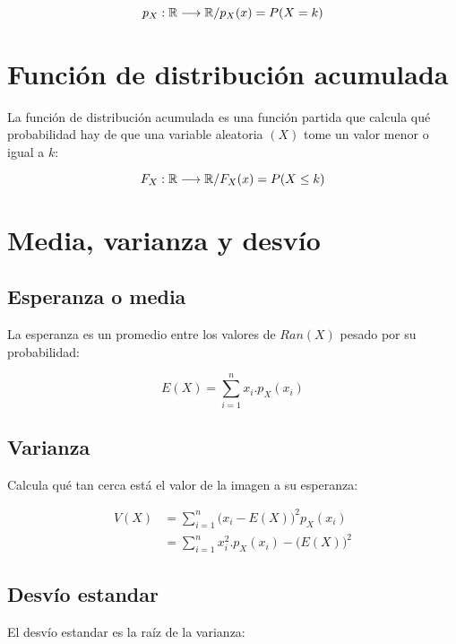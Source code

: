 \documentclass[a5paper,12pt,twoside]{book}
\begin{document}
\begin{equation}
p_X: \mathbb{R} \longrightarrow \mathbb{R} / p_X(x) = P(X=k)
\end{equation}

\section{Función de distribución acumulada}

La función de distribución acumulada es una función partida que calcula qué probabilidad hay de que una variable aleatoria $(X)$ tome un valor menor o igual a $k$:

\begin{equation}
F_X: \mathbb{R} \longrightarrow \mathbb{R} / F_X(x) = P(X \leq k)
\end{equation}

\section{Media, varianza y desvío}

\subsection{Esperanza o media}

La esperanza es un promedio entre los valores de $Ran(X)$ pesado por su probabilidad:

\begin{equation}
E(X)=\sum_{i=1}^n x_i . p_X(x_i)
\end{equation}

\subsection{Varianza}
Calcula qué tan cerca está el valor de la imagen a su esperanza:

\begin{equation}
\begin{split}
V(X) &= \sum_{i=1}^n \big( x_i-E(X) \big)^2 p_X(x_i)
\\
&= \sum_{i=1}^n x_i^2 . p_X(x_i) - \big(E(X)\big)^2
\end{split}
\end{equation}

\subsection{Desvío estandar}

El desvío estandar es la raíz de la varianza:
\end{document}
